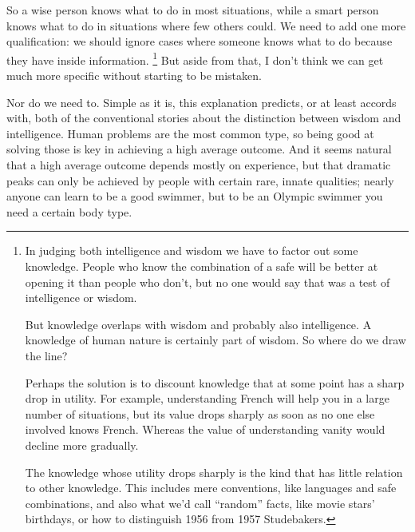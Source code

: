 \documentclass[12pt]{book}
\begin{document}
So a wise person knows what to do in most situations, while a smart
person knows what to do in situations where few others could. We need to
add one more qualification: we should ignore cases where someone knows
what to do because they have inside information. \footnote{In judging both intelligence and wisdom we have to factor out
some knowledge. People who know the combination of a safe will be better
at opening it than people who don't, but no one would say that was a
test of intelligence or wisdom.

But knowledge overlaps with wisdom and probably also intelligence. A
knowledge of human nature is certainly part of wisdom. So where do we
draw the line?

Perhaps the solution is to discount knowledge that at some point has a
sharp drop in utility. For example, understanding French will help you
in a large number of situations, but its value drops sharply as soon as
no one else involved knows French. Whereas the value of understanding
vanity would decline more gradually.

The knowledge whose utility drops sharply is the kind that has little
relation to other knowledge. This includes mere conventions, like
languages and safe combinations, and also what we'd call ``random''
facts, like movie stars' birthdays, or how to distinguish 1956 from 1957
Studebakers.}
But aside from that, I don't think we can get much more specific without
starting to be mistaken.

Nor do we need to. Simple as it is, this explanation predicts, or at
least accords with, both of the conventional stories about the
distinction between wisdom and intelligence. Human problems are the most
common type, so being good at solving those is key in achieving a high
average outcome. And it seems natural that a high average outcome
depends mostly on experience, but that dramatic peaks can only be
achieved by people with certain rare, innate qualities; nearly anyone
can learn to be a good swimmer, but to be an Olympic swimmer you need a
certain body type.
\end{document}
